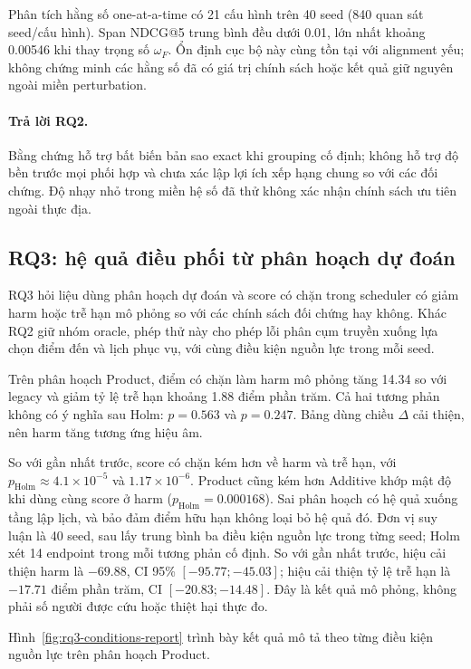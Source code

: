
Phân tích hằng số one-at-a-time có 21 cấu hình trên 40 seed (840 quan sát seed/cấu hình). Span NDCG@5 trung bình đều dưới 0.01, lớn nhất khoảng 0.00546 khi thay trọng số $\omega_F$. Ổn định cục bộ này cùng tồn tại với alignment yếu; không chứng minh các hằng số đã có giá trị chính sách hoặc kết quả giữ nguyên ngoài miền perturbation.

\paragraph{Trả lời RQ2.} Bằng chứng hỗ trợ bất biến bản sao exact khi grouping cố định; không hỗ trợ độ bền trước mọi phối hợp và chưa xác lập lợi ích xếp hạng chung so với các đối chứng. Độ nhạy nhỏ trong miền hệ số đã thử không xác nhận chính sách ưu tiên ngoài thực địa.

\subsection{RQ3: hệ quả điều phối từ phân hoạch dự đoán}\label{sec:rq3-discussion}
RQ3 hỏi liệu dùng phân hoạch dự đoán và score có chặn trong scheduler có giảm harm hoặc trễ hạn mô phỏng so với các chính sách đối chứng hay không. Khác RQ2 giữ nhóm oracle, phép thử này cho phép lỗi phân cụm truyền xuống lựa chọn điểm đến và lịch phục vụ, với cùng điều kiện nguồn lực trong mỗi seed.


Trên phân hoạch Product, điểm có chặn làm harm mô phỏng tăng 14.34 so với legacy và giảm tỷ lệ trễ hạn khoảng 1.88 điểm phần trăm. Cả hai tương phản không có ý nghĩa sau Holm: $p=0.563$ và $p=0.247$. Bảng dùng chiều $\Delta$ cải thiện, nên harm tăng tương ứng hiệu âm.

So với gần nhất trước, score có chặn kém hơn về harm và trễ hạn, với $p_{\mathrm{Holm}}\approx4.1\times10^{-5}$ và $1.17\times10^{-6}$. Product cũng kém hơn Additive khớp mật độ khi dùng cùng score ở harm ($p_{\mathrm{Holm}}=0.000168$). Sai phân hoạch có hệ quả xuống tầng lập lịch, và bảo đảm điểm hữu hạn không loại bỏ hệ quả đó.
Đơn vị suy luận là 40 seed, sau lấy trung bình ba điều kiện nguồn lực trong từng seed; Holm xét 14 endpoint trong mỗi tương phản cố định. So với gần nhất trước, hiệu cải thiện harm là $-69.88$, CI 95\% $[-95.77;-45.03]$; hiệu cải thiện tỷ lệ trễ hạn là $-17.71$ điểm phần trăm, CI $[-20.83;-14.48]$. Đây là kết quả mô phỏng, không phải số người được cứu hoặc thiệt hại thực đo.

Hình~\ref{fig:rq3-conditions-report} trình bày kết quả mô tả theo từng điều kiện nguồn lực trên phân hoạch Product.

